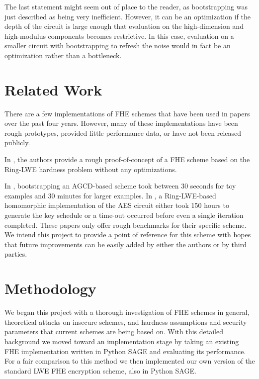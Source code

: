 \documentclass[letterpaper,twocolumn,10pt]{article}
\begin{document}
The last statement might seem out of place to the reader, as bootstrapping was just described as being very inefficient. However, it can be an optimization if the depth of the circuit is large enough that evaluation on the high-dimension and high-modulus components becomes restrictive. In this case, evaluation on a smaller circuit with bootstrapping to refresh the noise would in fact be an optimization rather than a bottleneck.


\section{Related Work}
There are a few implementations of FHE schemes that have been used in papers over the past four years. However, many of these implementations have been rough prototypes, provided little performance data, or have not been released publicly. 

In \cite{Practical}, the authors provide a rough proof-of-concept of a FHE scheme based on the Ring-LWE hardness problem without any optimizations. 

In \cite{ImplementingGentry}, bootstrapping an AGCD-based scheme took between 30 seconds for toy examples and 30 minutes for larger examples. In \cite{AES}, a Ring-LWE-based homomorphic implementation of the AES circuit either took 150 hours to generate the key schedule or a time-out occurred before even a single iteration completed. These papers only offer rough benchmarks for their specific scheme. We intend this project to provide a point of reference for this scheme with hopes that future improvements can be easily added by either the authors or by third parties.



\section{Methodology}
We began this project with a thorough investigation of FHE schemes in general, theoretical attacks on insecure schemes, and hardness assumptions and security parameters that current schemes are being based on. With this detailed background we moved toward an implementation stage by taking an existing FHE implementation written in Python SAGE and evaluating its performance. For a fair comparison to this method we then implemented our own version of the standard LWE FHE encryption scheme, also in Python SAGE.
\end{document}
